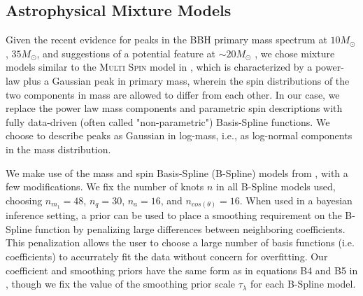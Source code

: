 
\subsection{Astrophysical Mixture Models} \label{sec:astromodels} 

Given the recent evidence for peaks in the BBH primary mass spectrum at $10 M_{\odot}$, $35 M_{\odot}$, and suggestions of a potential feature at $\sim20 M_{\odot}$ \citep{10.3847/2041-8213/aa9bf6, 10.3847/1538-4357/aab34c, 10.3847/2041-8213/ab3800, 2021ApJ...913L...7A, 2111.03634, 2022ApJ...928..155T,2022arXiv221012834E}, we chose mixture models similar to the \textsc{Multi Spin} model in \cite{2021ApJ...913L...7A}, which is characterized by a power-law plus a Gaussian peak in primary mass, wherein the spin distributions of the two components in mass are allowed to differ from each other. In our case, we replace the power law mass components and parametric spin descriptions with fully data-driven (often called "non-parametric") Basis-Spline functions. We choose to describe peaks as Gaussian in log-mass, i.e., as log-normal components in the mass distribution.

We make use of the mass and spin Basis-Spline (B-Spline) models from \cite{2022arXiv221012834E}, with a few modifications. We fix the number of knots $n$ in all B-Spline models used, choosing $n_{m_1}=48$, $n_{q}=30$, $n_a=16$, and $n_{cos(\theta)}=16$. When used in a bayesian inference setting, a prior can be used to place a smoothing requirement on the B-Spline function by penalizing large differences between neighboring coefficients. This penalization allows the user to choose a large number of basis functions (i.e. coefficients) to accurrately fit the data without concern for overfitting. Our coefficient and smoothing priors have the same form as in equations B4 and B5 in \brucepaper{}, though we fix the value of the smoothing prior scale $\tau_\lambda$ for each B-Spline model. 

